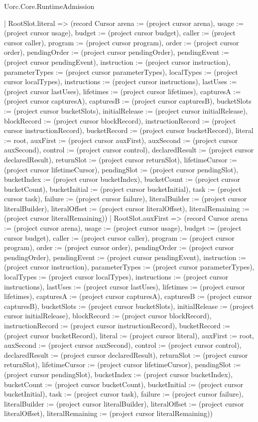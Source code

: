 \begin{lexlean}{Uorc.Core.RuntimeAdmission}
\begin{semanticmodule}
{    | RootSlot.literal => (record Cursor {arena := (project cursor arena), usage := (project cursor usage), budget := (project cursor budget), caller := (project cursor caller), program := (project cursor program), order := (project cursor order), pendingOrder := (project cursor pendingOrder), pendingEvent := (project cursor pendingEvent), instruction := (project cursor instruction), parameterTypes := (project cursor parameterTypes), localTypes := (project cursor localTypes), instructions := (project cursor instructions), lastUses := (project cursor lastUses), lifetimes := (project cursor lifetimes), capturesA := (project cursor capturesA), capturesB := (project cursor capturesB), bucketSlots := (project cursor bucketSlots), initialRelease := (project cursor initialRelease), blockRecord := (project cursor blockRecord), instructionRecord := (project cursor instructionRecord), bucketRecord := (project cursor bucketRecord), literal := root, auxFirst := (project cursor auxFirst), auxSecond := (project cursor auxSecond), control := (project cursor control), declaredResult := (project cursor declaredResult), returnSlot := (project cursor returnSlot), lifetimeCursor := (project cursor lifetimeCursor), pendingSlot := (project cursor pendingSlot), bucketIndex := (project cursor bucketIndex), bucketCount := (project cursor bucketCount), bucketInitial := (project cursor bucketInitial), task := (project cursor task), failure := (project cursor failure), literalBuilder := (project cursor literalBuilder), literalOffset := (project cursor literalOffset), literalRemaining := (project cursor literalRemaining)})
    | RootSlot.auxFirst => (record Cursor {arena := (project cursor arena), usage := (project cursor usage), budget := (project cursor budget), caller := (project cursor caller), program := (project cursor program), order := (project cursor order), pendingOrder := (project cursor pendingOrder), pendingEvent := (project cursor pendingEvent), instruction := (project cursor instruction), parameterTypes := (project cursor parameterTypes), localTypes := (project cursor localTypes), instructions := (project cursor instructions), lastUses := (project cursor lastUses), lifetimes := (project cursor lifetimes), capturesA := (project cursor capturesA), capturesB := (project cursor capturesB), bucketSlots := (project cursor bucketSlots), initialRelease := (project cursor initialRelease), blockRecord := (project cursor blockRecord), instructionRecord := (project cursor instructionRecord), bucketRecord := (project cursor bucketRecord), literal := (project cursor literal), auxFirst := root, auxSecond := (project cursor auxSecond), control := (project cursor control), declaredResult := (project cursor declaredResult), returnSlot := (project cursor returnSlot), lifetimeCursor := (project cursor lifetimeCursor), pendingSlot := (project cursor pendingSlot), bucketIndex := (project cursor bucketIndex), bucketCount := (project cursor bucketCount), bucketInitial := (project cursor bucketInitial), task := (project cursor task), failure := (project cursor failure), literalBuilder := (project cursor literalBuilder), literalOffset := (project cursor literalOffset), literalRemaining := (project cursor literalRemaining)})
}
\end{semanticmodule}
\end{lexlean}
